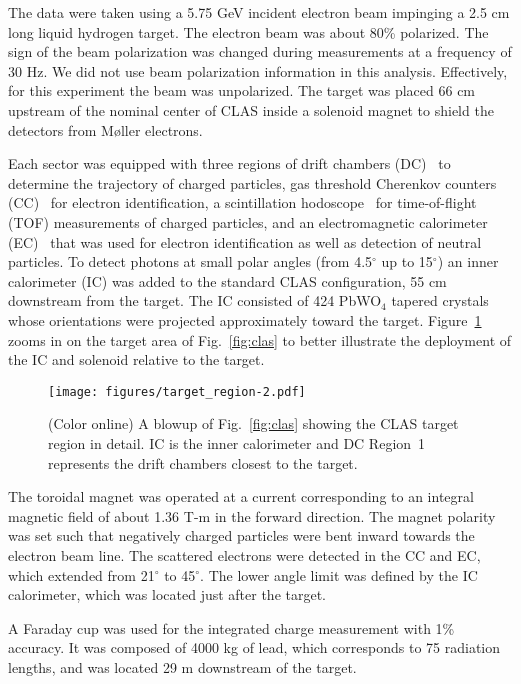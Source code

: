 \documentclass[prc,aps,floatfix,showpacs,showkeys,twocolumn,superscriptaddress,letterpaper,10pt]{revtex4-1}
\begin{document}
The data were taken using a 5.75 GeV incident electron beam impinging a 2.5 cm long liquid hydrogen target. 
The electron beam was about 80\% polarized. The sign of the beam polarization was changed during measurements at a frequency of 30 Hz. We did not use beam polarization information in this analysis. Effectively, for this experiment the beam was unpolarized.
The target was placed 66 cm upstream of the nominal center of CLAS inside a solenoid magnet to shield the detectors from 
M{\o}ller electrons.

Each sector was equipped with three regions of drift chambers (DC)~\cite{Mestayer:2000we}
to determine the trajectory of charged particles, gas threshold Cherenkov counters (CC)~\cite{Adams:2001kk} 
for electron identification, a scintillation hodoscope~\cite{Smith:1999ii}  for time-of-flight (TOF) measurements of charged particles, and an electromagnetic calorimeter (EC)~\cite{Amarian:2001zs}  that was used for electron identification as well as detection of neutral particles. 
To detect photons at small polar angles (from 4.5$^\circ$ up to 15$^\circ$) an inner calorimeter (IC) was added to the standard CLAS configuration, 55 cm downstream from the target. The IC  consisted of 424 PbWO$_4$ tapered crystals whose orientations were projected approximately toward the target.
Figure~\ref{fig:target} zooms in on the target area of Fig.~\ref{fig:clas}
to better illustrate the deployment of the IC and solenoid relative to the target.

\begin{figure}
\texttt{[image: figures/target\_region-2.pdf]}
\caption{(Color online) A blowup of Fig.~\ref{fig:clas} showing  the CLAS target region  in detail. IC is the inner calorimeter and  DC Region~1 represents the drift chambers closest to the target. 
}\label{fig:target}
\end{figure}




The toroidal magnet was operated at a current
corresponding to an integral magnetic field of about 1.36 T-m in the forward direction.
 The magnet polarity was set such that negatively charged particles were bent inward towards the electron beam line. The 
scattered electrons were detected in the CC and EC, which extended from 21$^\circ$ to 45$^\circ$. The lower angle limit was defined by the IC calorimeter, which was located just after the target.


 A Faraday cup was used for the integrated charge measurement with 1\% accuracy. It was  composed of 4000 kg of lead, which corresponds to 75 radiation lengths, and was located 29 m downstream of the target. 
\end{document}
